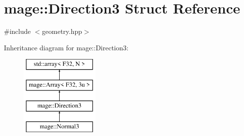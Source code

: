 \hypertarget{structmage_1_1_direction3}{}\section{mage\+:\+:Direction3 Struct Reference}
\label{structmage_1_1_direction3}


{\ttfamily \#include $<$geometry.\+hpp$>$}

Inheritance diagram for mage\+:\+:Direction3\+:\begin{figure}[H]
\begin{center}
\leavevmode
\includegraphics[height=4.000000cm]{structmage_1_1_direction3}
\end{center}
\end{figure}
